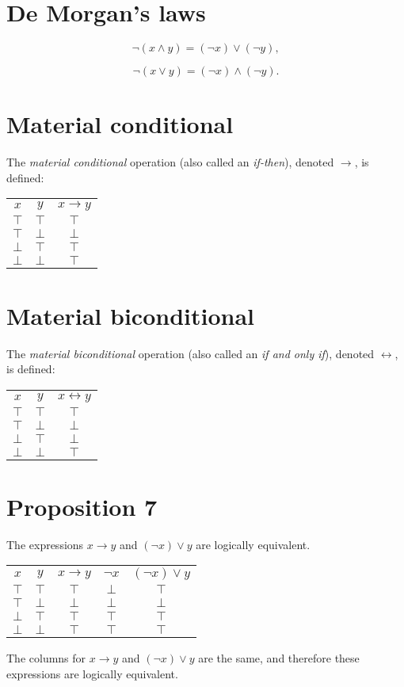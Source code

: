 \documentclass[12pt]{article}
\begin{document}
\section*{De Morgan's laws}
\[\lnot(x\land y)=(\lnot x)\lor(\lnot y),\]

\[\lnot(x\lor y)=(\lnot x)\land(\lnot y).\]
\section*{Material conditional}
The \textit{material conditional} operation (also called an \textit{if-then}), denoted $\rightarrow$, is defined:
\begin{center}
\begin{tabular}{c|c||c}
$x$&$y$&$x\rightarrow y$\\
$\top$&$\top$&$\top$\\
$\top$&$\bot$&$\bot$\\
$\bot$&$\top$&$\top$\\
$\bot$&$\bot$&$\top$
\end{tabular}
\end{center}
\section*{Material biconditional}
The \textit{material biconditional} operation (also called an \textit{if and only if}), denoted $\leftrightarrow$, is defined:
\begin{center}
\begin{tabular}{c|c||c}
$x$&$y$&$x\leftrightarrow y$\\
$\top$&$\top$&$\top$\\
$\top$&$\bot$&$\bot$\\
$\bot$&$\top$&$\bot$\\
$\bot$&$\bot$&$\top$
\end{tabular}
\end{center}
\section*{Proposition 7}
The expressions $x\rightarrow y$ and $(\lnot x)\lor y$ are logically equivalent.
\begin{center}
\begin{tabular}{c|c|c|c|c}
$x$&$y$&$x\rightarrow y$&$\lnot x$&$(\lnot x)\lor y$\\
$\top$&$\top$&$\top$&$\bot$&$\top$\\
$\top$&$\bot$&$\bot$&$\bot$&$\bot$\\
$\bot$&$\top$&$\top$&$\top$&$\top$\\
$\bot$&$\bot$&$\top$&$\top$&$\top$
\end{tabular}
\end{center}
The columns for $x\rightarrow y$ and $(\lnot x)\lor y$ are the same, and therefore these expressions are logically equivalent.
\end{document}
